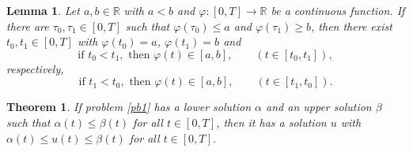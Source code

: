 \documentclass[10pt,a4paper]{amsart}
\newtheorem{theorem}{Theorem}
\newtheorem{lemma}{Lemma}
\begin{document}
\begin{lemma}\label{elemlema}
Let $a,b\in\mathbb{R}$ with $a<b$ and $\varphi:[0,T]\to\mathbb{R}$ be a continuous function. If there are $\tau_0, \tau_1\in [0,T]$ such that $\varphi(\tau_0)\leq a$ and $\varphi(\tau_1) \geq b$, then there exist $t_0, t_1\in [0,T]$ with $\varphi(t_0)=a$, $\varphi(t_1)=b$ and
$$\mbox{if } t_0<t_1, \mbox{ then }\varphi(t)\in[a,b],\qquad  (t\in[t_0,t_1]),$$
respectively,
$$\mbox{if } t_1<t_0, \mbox{ then }\varphi(t)\in[a,b],\qquad  (t\in[t_1,t_0]).$$
\end{lemma}

\begin{theorem}\label{lemalu}
If problem \eqref{pb1} has a lower solution $\alpha$ and an upper solution $\beta$ such that $\alpha(t)\leq\beta(t)$ for all $t\in[0,T]$,  then it has a solution $u$ with $\alpha(t)\leq u(t)\leq\beta(t)$ for all $t\in[0,T]$.
\end{theorem}
\end{document}
